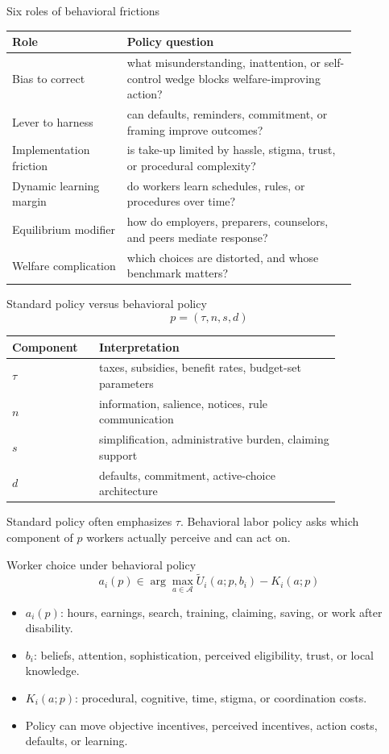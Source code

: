 \documentclass[aspectratio=169,11pt]{beamer}
\begin{document}
\begin{frame}{Six roles of behavioral frictions}
\small
\begin{tabular}{p{0.29\linewidth} p{0.56\linewidth}}
\toprule
Role & Policy question \\
\midrule
Bias to correct & what misunderstanding, inattention, or self-control wedge blocks welfare-improving action? \\
Lever to harness & can defaults, reminders, commitment, or framing improve outcomes? \\
Implementation friction & is take-up limited by hassle, stigma, trust, or procedural complexity? \\
Dynamic learning margin & do workers learn schedules, rules, or procedures over time? \\
Equilibrium modifier & how do employers, preparers, counselors, and peers mediate response? \\
Welfare complication & which choices are distorted, and whose benchmark matters? \\
\bottomrule
\end{tabular}
\end{frame}

\begin{frame}{Standard policy versus behavioral policy}
\[
p = (\tau, n, s, d)
\]

\small
\begin{tabular}{p{0.18\linewidth} p{0.63\linewidth}}
\toprule
Component & Interpretation \\
\midrule
$\tau$ & taxes, subsidies, benefit rates, budget-set parameters \\
$n$ & information, salience, notices, rule communication \\
$s$ & simplification, administrative burden, claiming support \\
$d$ & defaults, commitment, active-choice architecture \\
\bottomrule
\end{tabular}

\vspace{0.7em}
Standard policy often emphasizes $\tau$. Behavioral labor policy asks which component of $p$ workers actually perceive and can act on.
\end{frame}

\begin{frame}{Worker choice under behavioral policy}
\[
a_i(p) \in \arg\max_{a \in \mathcal{A}} \tilde U_i(a; p, b_i) - K_i(a; p)
\]

\begin{itemize}
    \item $a_i(p)$: hours, earnings, search, training, claiming, saving, or work after disability.
    \item $b_i$: beliefs, attention, sophistication, perceived eligibility, trust, or local knowledge.
    \item $K_i(a;p)$: procedural, cognitive, time, stigma, or coordination costs.
    \item Policy can move objective incentives, perceived incentives, action costs, defaults, or learning.
\end{itemize}
\end{frame}
\end{document}
